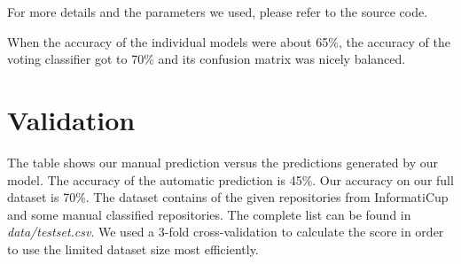 \documentclass[a4paper]{scrartcl}
\begin{document}
For more details and the parameters we used, please refer to the source code.

When the accuracy of the individual models were about 65\%, the accuracy of the voting classifier got to 70\% and its confusion matrix was nicely balanced.


\section{Validation}
\label{sec:val}

The table shows our manual prediction versus the predictions generated by our model. The accuracy of the automatic prediction is 45\%. Our accuracy on our full dataset is 70\%. The dataset contains of the given repositories from InformatiCup and some manual classified repositories. The complete list can be found in \textit{data/testset.csv}. We used a 3-fold cross-validation to calculate the score in order to use the limited dataset size most efficiently.
\end{document}
